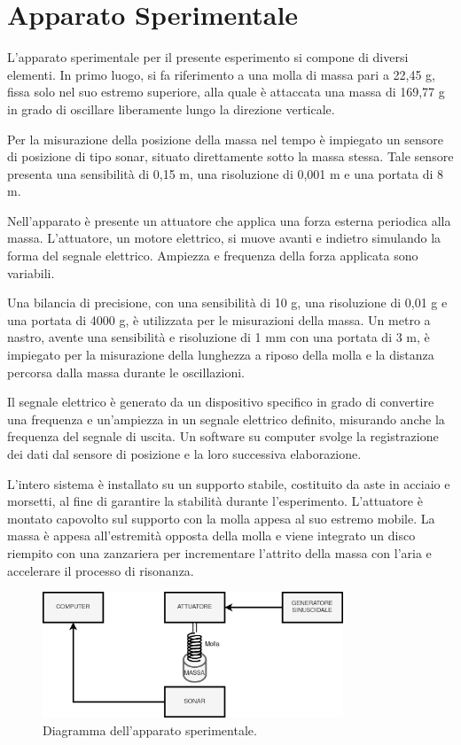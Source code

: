\documentclass[12pt]{article}
\begin{document}
\section{Apparato Sperimentale}

L'apparato sperimentale per il presente esperimento si compone di diversi elementi. In primo luogo, si fa riferimento a una molla di massa pari a 22,45 g, fissa solo nel suo estremo superiore, alla quale è attaccata una massa di 169,77 g in grado di oscillare liberamente lungo la direzione verticale.

Per la misurazione della posizione della massa nel tempo è impiegato un sensore di posizione di tipo sonar, situato direttamente sotto la massa stessa. Tale sensore presenta una sensibilità di 0,15 m, una risoluzione di 0,001 m e una portata di 8 m.

Nell'apparato è presente un attuatore che applica una forza esterna periodica alla massa. L'attuatore, un motore elettrico, si muove avanti e indietro simulando la forma del segnale elettrico. Ampiezza e frequenza della forza applicata sono variabili.

Una bilancia di precisione, con una sensibilità di 10 g, una risoluzione di 0,01 g e una portata di 4000 g, è utilizzata per le misurazioni della massa. Un metro a nastro, avente una sensibilità e risoluzione di 1 mm con una portata di 3 m, è impiegato per la misurazione della lunghezza a riposo della molla e la distanza percorsa dalla massa durante le oscillazioni.

Il segnale elettrico è generato da un dispositivo specifico in grado di convertire una frequenza e un'ampiezza in un segnale elettrico definito, misurando anche la frequenza del segnale di uscita. Un software su computer svolge la registrazione dei dati dal sensore di posizione e la loro successiva elaborazione.

L'intero sistema è installato su un supporto stabile, costituito da aste in acciaio e morsetti, al fine di garantire la stabilità durante l'esperimento. L'attuatore è montato capovolto sul supporto con la molla appesa al suo estremo mobile. La massa è appesa all'estremità opposta della molla e viene integrato un disco riempito con una zanzariera per incrementare l'attrito della massa con l'aria e accelerare il processo di risonanza.

\begin{figure}[htbp]
  \centering
  \includegraphics[width=0.8\textwidth]{diagramma.png}
  \captionsetup{labelformat=empty}
  \caption{Diagramma dell'apparato sperimentale.}
  \label{fig:diagramma.png}
\end{figure}
\end{document}
